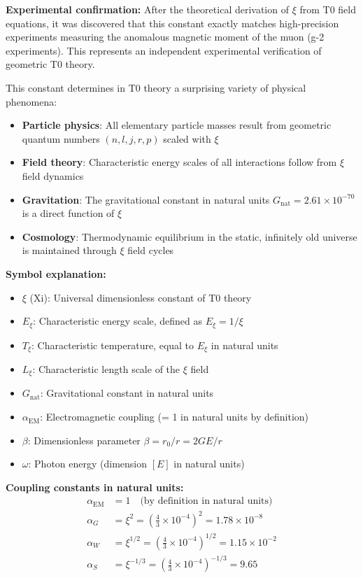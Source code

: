	\textbf{Experimental confirmation:} After the theoretical derivation of $\xi$ from T0 field equations, it was discovered that this constant exactly matches high-precision experiments measuring the anomalous magnetic moment of the muon (g-2 experiments). This represents an independent experimental verification of geometric T0 theory.
	
	This constant determines in T0 theory a surprising variety of physical phenomena:
	\begin{itemize}
		\item \textbf{Particle physics}: All elementary particle masses result from geometric quantum numbers $(n,l,j,r,p)$ scaled with $\xi$
		\item \textbf{Field theory}: Characteristic energy scales of all interactions follow from $\xi$ field dynamics
		\item \textbf{Gravitation}: The gravitational constant in natural units $G_{\text{nat}} = 2.61 \times 10^{-70}$ is a direct function of $\xi$
		\item \textbf{Cosmology}: Thermodynamic equilibrium in the static, infinitely old universe is maintained through $\xi$ field cycles
	\end{itemize}
	
	\textbf{Symbol explanation:}
	\begin{itemize}
		\item $\xi$ (Xi): Universal dimensionless constant of T0 theory
		\item $E_\xi$: Characteristic energy scale, defined as $E_\xi = 1/\xi$
		\item $T_\xi$: Characteristic temperature, equal to $E_\xi$ in natural units
		\item $L_\xi$: Characteristic length scale of the $\xi$ field
		\item $G_{\text{nat}}$: Gravitational constant in natural units
		\item $\alpha_{\text{EM}}$: Electromagnetic coupling (= 1 in natural units by definition)
		\item $\beta$: Dimensionless parameter $\beta = r_0/r = 2GE/r$
		\item $\omega$: Photon energy (dimension $[E]$ in natural units)
	\end{itemize}
	
	\textbf{Coupling constants in natural units:}
	\begin{align}
		\alpha_{\text{EM}} &= 1 \quad \text{(by definition in natural units)} \\
		\alpha_G &= \xi^2 = \left(\frac{4}{3} \times 10^{-4}\right)^2 = 1.78 \times 10^{-8} \\
		\alpha_W &= \xi^{1/2} = \left(\frac{4}{3} \times 10^{-4}\right)^{1/2} = 1.15 \times 10^{-2} \\
		\alpha_S &= \xi^{-1/3} = \left(\frac{4}{3} \times 10^{-4}\right)^{-1/3} = 9.65
	\end{align}
	
